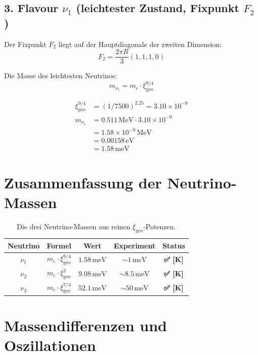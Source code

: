 \documentclass[11pt,a4paper]{article}
\newcommand{\xigeo}{\xi_{\text{geo}}}
\newcommand{\Checkmark}{\textbf{✅ [K]}}
\begin{document}
	\subsection{3. Flavour $\nu_1$ (leichtester Zustand, Fixpunkt $F_2$)}
	
	Der Fixpunkt $F_2$ liegt auf der Hauptdiagonale der zweiten Dimension:
	\begin{equation}
		F_2 = \frac{2\pi R}{3}(1, 1, 1, 0)
	\end{equation}
	
	Die Masse des leichtesten Neutrinos:
	\begin{equation}
		m_{\nu_1} = m_e \cdot \xigeo^{9/4}
	\end{equation}
	
	\begin{align}
		\xigeo^{9/4} &= (1/7500)^{2.25} = 3.10 \times 10^{-9} \\
		m_{\nu_1} &= 0.511\,\text{MeV} \cdot 3.10 \times 10^{-9} \\
		&= 1.58 \times 10^{-9}\,\text{MeV} \\
		&= 0.00158\,\text{eV} \\
		&= 1.58\,\text{meV}
	\end{align}
	
	\section{Zusammenfassung der Neutrino-Massen}
	
	\begin{table}[h!]
		\centering
		\caption{Die drei Neutrino-Massen aus reinen $\xigeo$-Potenzen.}
		\label{tab:neutrino_masses}
		\begin{tabular}{c c c c c}
			\toprule
			\textbf{Neutrino} & \textbf{Formel} & \textbf{Wert} & \textbf{Experiment} & \textbf{Status} \\
			\midrule
			$\nu_1$ & $m_e \cdot \xigeo^{9/4}$ & $1.58\,\text{meV}$ & $\sim 1\,\text{meV}$ & \Checkmark \\
			$\nu_2$ & $m_e \cdot \xigeo^{2}$ & $9.08\,\text{meV}$ & $\sim 8.5\,\text{meV}$ & \Checkmark \\
			$\nu_3$ & $m_e \cdot \xigeo^{7/4}$ & $52.1\,\text{meV}$ & $\sim 50\,\text{meV}$ & \Checkmark \\
			\bottomrule
		\end{tabular}
	\end{table}
	
	\section{Massendifferenzen und Oszillationen}
	
\end{document}
